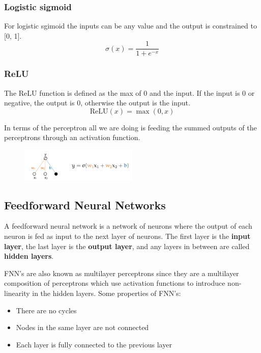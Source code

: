 \documentclass[12pt]{article}
\begin{document}
\begin{multicols}{2}
    \subsubsection*{Logistic sigmoid}
    For logistic sgimoid the inputs can be any value and the output is constrained to [0, 1].
    \[ \sigma(x) = \frac{1}{1 + e^{-x}} \]
    \columnbreak
    \subsubsection*{ReLU}
    The ReLU function is defined as the max of 0 and the input. If the input is 0 or negative, the output is 0, otherwise the output is the input.
    \[ \text{ReLU}(x) = \max(0, x) \]
    \vfill\null
\end{multicols}

In terms of the perceptron all we are doing is feeding the summed outputs of the perceptrons through an activation function. 

\begin{figure}[!h]
    \centering
    \includegraphics[width=0.5\textwidth]{assets/perceptronwithact.png}
\end{figure}

\subsection{Feedforward Neural Networks}

\begin{definition}
    A feedforward neural network is a network of neurons where the output of each neuron is fed as input to the next layer of neurons. The first layer is the \textbf{input layer}, the last layer is the \textbf{output layer}, and any layers in between are called \textbf{hidden layers}.
\end{definition}

FNN's are also known as multilayer perceptrons since they are a multilayer composition of perceptrons which use activation functions to introduce non-linearity in the hidden layers. 
\smallskip
Some properties of FNN's:
\begin{itemize}[leftmargin=*, noitemsep]
    \item There are no cycles
    \item Nodes in the same layer are not connected
    \item Each layer is fully connected to the previous layer
\end{itemize}
\end{document}

